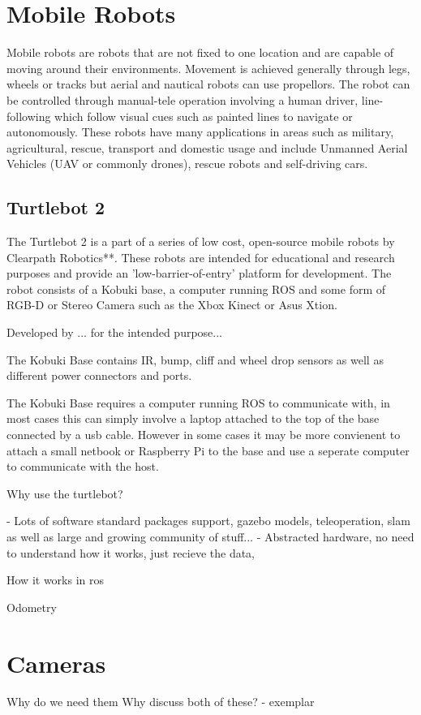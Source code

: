 \documentclass{mproj}
\begin{document}
\section{Mobile Robots}


Mobile robots are robots that are not fixed to one location and are capable of moving around their environments. Movement is achieved generally through legs, wheels or tracks but aerial and nautical robots can use propellors. The robot can be controlled through manual-tele operation involving a human driver, line-following which follow visual cues such as painted lines to navigate or autonomously. These robots have many applications in areas such as military, agricultural, rescue, transport and domestic usage and include Unmanned Aerial Vehicles (UAV or commonly drones), rescue robots and self-driving cars.


\subsection{Turtlebot 2}

The Turtlebot 2 is a part of a series of low cost, open-source mobile robots by Clearpath Robotics**. These robots are intended for educational and research purposes and provide an 'low-barrier-of-entry' platform for development. The robot consists of a Kobuki base, a computer running ROS and some form of RGB-D or Stereo Camera such as the Xbox Kinect or Asus Xtion.

Developed by ... for the intended purpose... 

The Kobuki Base contains IR, bump, cliff and wheel drop sensors as well as different power connectors and ports.

The Kobuki Base requires a computer running ROS to communicate with, in most cases this can simply involve a laptop attached to the top of the base connected by a usb cable. However in some cases it may be more convienent to attach a small netbook or Raspberry Pi to the base and use a seperate computer to communicate with the host.

Why use the turtlebot?

- Lots of software standard packages support, gazebo models, teleoperation, slam as well as large and growing community of stuff...
- Abstracted hardware, no need to understand how it works, just recieve the data,

How it works in ros

Odometry

\section{Cameras}
Why do we need them
Why discuss both of these? - exemplar
\end{document}
